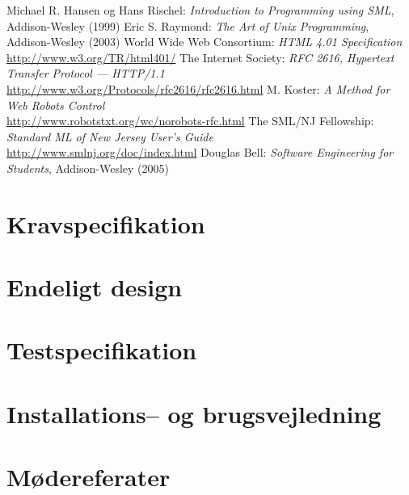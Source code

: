 \documentclass[a4paper,oneside]{memoir}
\begin{document}
\begin{thebibliography}{9}
 Michael R. Hansen og Hans Rischel: {\em
  Introduction to Programming using SML}, Addison-Wesley (1999)
 Eric S. Raymond: {\em
  The Art of Unix Programming}, Addison-Wesley (2003)
 World Wide Web Consortium: {\em HTML 4.01
  Specification}\\ \url{http://www.w3.org/TR/html401/}
 The Internet Society: {\em RFC 2616, Hypertext Transfer Protocol --- HTTP/1.1}\\
  \url{http://www.w3.org/Protocols/rfc2616/rfc2616.html}
 M. Koster: {\em A Method for Web
    Robots Control}\\
  \url{http://www.robotstxt.org/wc/norobots-rfc.html}
 The SML/NJ Fellowship: {\em Standard ML of New
  Jersey User's Guide}\\ 
  \url{http://www.smlnj.org/doc/index.html}
 Douglas Bell: {\em Software Engineering for Students},
  Addison-Wesley (2005)
\end{thebibliography}

\appendix

\chapter{Kravspecifikation}


\chapter{Endeligt design}


\chapter{Testspecifikation}


\chapter{Installations-- og brugsvejledning}


\chapter{Mødereferater}

\end{document}

